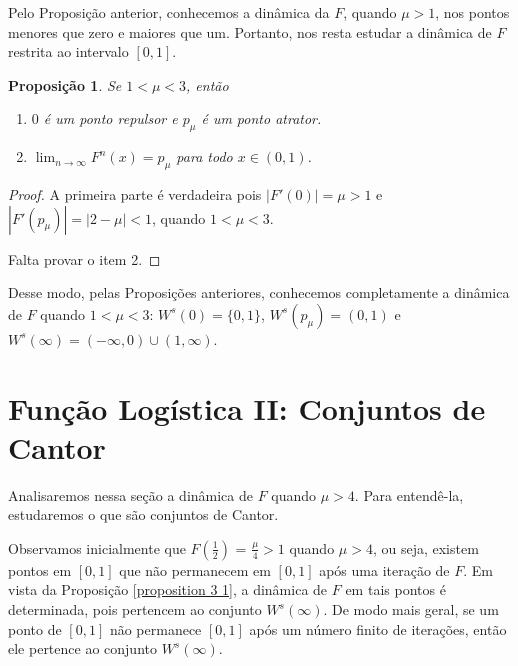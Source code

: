 \documentclass[a4paper, 12pt]{article}
\theoremstyle{definition}
\theoremstyle{plain}
\newtheorem{proposition}[definition]{Proposição}
\theoremstyle{plain}
\theoremstyle{plain}
\theoremstyle{definition}
\theoremstyle{remark}
\begin{document}
Pelo Proposição anterior, conhecemos a dinâmica da $F$, quando $\mu > 1$, nos pontos menores que zero e maiores que um. Portanto, nos resta estudar a dinâmica de $F$ restrita ao intervalo $[0, 1]$.

\begin{proposition}
Se $1 < \mu < 3$, então
\begin{enumerate}
\item $0$ é um ponto repulsor e $p_\mu$ é um ponto atrator.
\item $\lim_{n \to \infty} F^n(x) = p_\mu$ para todo $x \in (0, 1)$.
\end{enumerate}
\end{proposition}

\begin{proof}
A primeira parte é verdadeira pois $|F'(0)| = \mu > 1$ e $|F'(p_\mu)| = |2 - \mu| < 1$, quando $1 < \mu < 3$.

Falta provar o item 2.
\end{proof}

Desse modo, pelas Proposições anteriores, conhecemos completamente a dinâmica de $F$ quando $1 < \mu < 3$: $W^s(0) = \{0, 1\}$, $W^s(p_\mu) = (0, 1)$ e $W^s(\infty) = (-\infty, 0) \cup (1, \infty)$.

\section{Função Logística II: Conjuntos de Cantor}

Analisaremos nessa seção a dinâmica de $F$ quando $\mu > 4$. Para entendê-la, estudaremos o que são conjuntos de Cantor.

Observamos inicialmente que $F\left(\frac{1}{2}\right)$ = $\frac{\mu}{4} > 1$ quando $\mu > 4$, ou seja, existem pontos em $[0, 1]$ que não permanecem em $[0, 1]$ após uma iteração de $F$. Em vista da Proposição \ref{proposition 3 1}, a dinâmica de $F$ em tais pontos é determinada, pois pertencem ao conjunto $W^s(\infty)$. De modo mais geral, se um ponto de $[0, 1]$ não permanece $[0, 1]$ após um número finito de iterações, então ele pertence ao conjunto $W^s(\infty)$. 
\end{document}
